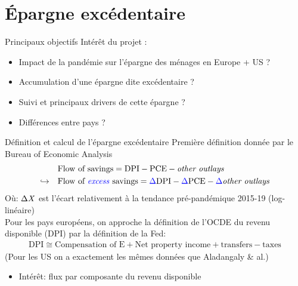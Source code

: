 \documentclass[9pt, xcolor={dvipsnames}]{beamer}
\newcommand{\blue}[1]{\textcolor{blue}{#1}}
\begin{document}
\section{Épargne excédentaire}
\sectionpage
\begin{frame}{Principaux objectifs}
  Intérêt du projet :
  \begin{itemize}
    \item Impact de la pandémie sur l'épargne des ménages en Europe + US ? 
    \item Accumulation d'une épargne dite excédentaire ? 
    \item Suivi et principaux drivers de cette épargne ? 
    \item Différences entre pays ?  
  \end{itemize}
\end{frame}

\begin{frame}{Définition et calcul de l'épargne excédentaire}
  Première définition donnée par le Bureau of Economic Analysis
  \begin{align*}
    &\textrm{Flow of savings} = \textrm{DPI} - \textrm{PCE} - \textrm{\textit{other outlays}} \\
    \hookrightarrow \quad &\textrm{Flow of \blue{\textit{excess}} savings} = \blue{\Delta} \textrm{DPI} - \blue{\Delta} \textrm{PCE} - \blue{\Delta} \textrm{\textit{other outlays}}
  \end{align*}
  Où: $\Delta \textrm{\textit{X}}$ est l'écart relativement à la tendance pré-pandémique 2015-19 (log-linéaire) \\ 
  \vspace{.3cm}
  Pour les pays européens, on approche la définition de l'OCDE du revenu disponible (DPI) par la définition de la Fed:
  \begin{align*}
    \textrm{DPI} \cong  \textrm{Compensation of E} + \textrm{Net property income} + \textrm{transfers} - \textrm{taxes}
  \end{align*}
  (Pour les US on a exactement les mêmes données que Aladangaly \& al.)
  \vspace{.3cm}
  \begin{itemize}
    \item Intérêt: flux par composante du revenu disponible
  \end{itemize}
\end{frame}
\end{document}
